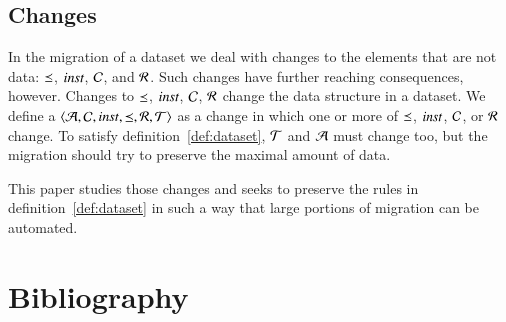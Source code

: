 \documentclass{elsarticle}
\begin{document}
\subsection{Changes}
	In the migration of a dataset we deal with changes to the elements that are not data:
	$\preceq$, $\text{\it inst\/}$, $\mathcal{C}$, and $\mathcal{R}$.
	Such changes have further reaching consequences, however.
	Changes to $\preceq$, $\text{\it inst\/}$, $\mathcal{C}$, $\mathcal{R}$ change the data structure in a dataset.
	We define a  $\langle\mathcal{A},\mathcal{C},\text{\it inst\/},\preceq,\mathcal{R},\mathcal{T}\rangle$ as a change in which one or more of $\preceq$, $\text{\it inst\/}$, $\mathcal{C}$, or $\mathcal{R}$ change.
	To satisfy definition~\ref{def:dataset}, $\mathcal{T}$ and $\mathcal{A}$ must change too,
	but the migration should try to preserve the maximal amount of data.

	This paper studies those changes and seeks to preserve the rules in definition~\ref{def:dataset}
	in such a way that large portions of migration can be automated.


\section{Bibliography}


\end{document}
